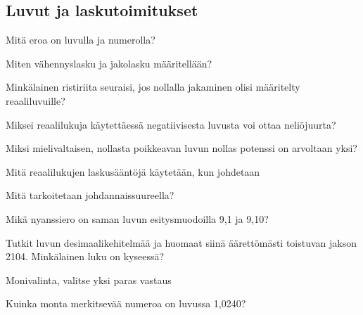 \subsection*{Luvut ja laskutoimitukset}

\begin{tehtava}
Mitä eroa on luvulla ja numerolla?
\end{tehtava}

\begin{tehtava}
Miten vähennyslasku ja jakolasku määritellään?
\end{tehtava}

\begin{tehtava}
Minkälainen ristiriita seuraisi, jos nollalla jakaminen olisi määritelty reaaliluvuille?
\end{tehtava}

\begin{tehtava}
Miksei reaalilukuja käytettäessä negatiivisesta luvusta voi ottaa neliöjuurta?
\end{tehtava}

\begin{tehtava}
Miksi mielivaltaisen, nollasta poikkeavan luvun nollas potenssi on arvoltaan yksi?
\end{tehtava}

\begin{tehtava}
Mitä reaalilukujen laskusääntöjä käytetään, kun johdetaan 
\begin{alakohdat}
\end{alakohdat}
\end{tehtava}

\begin{tehtava}
Mitä tarkoitetaan johdannaissuureella?
\end{tehtava}

\begin{tehtava}
Mikä nyanssiero on saman luvun esitysmuodoilla 9,1 ja 9,10?
\end{tehtava}

\begin{tehtava}
Tutkit luvun desimaalikehitelmää ja huomaat siinä äärettömästi toistuvan jakson 2104. Minkälainen luku on kyseessä?
\end{tehtava}

Monivalinta, valitse yksi paras vastaus
\begin{tehtava}
Kuinka monta merkitsevää numeroa on luvussa 1,0240?
\begin{alakohdat}
\end{alakohdat}
\end{tehtava}

